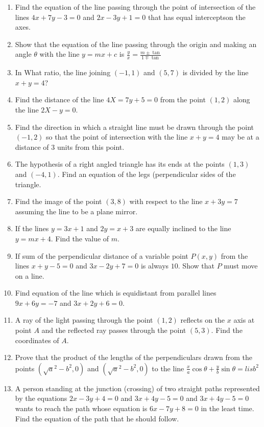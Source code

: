 \documentclass{article}
\theoremstyle{remark}
\begin{document}
\begin{enumerate}
\item Find the equation of the line passing through the point of intersection of the lines $4x+7y-3=0$ and $2x-3y+1=0$ that has equal interceptson the axes.
\item Show that the equation of the line passing through the origin and making an angle $\theta$ with the line $y=mx+c$ is $\frac {y}{x}=\frac {m\pm \tan}{1\mp \tan}$
\item In What ratio, the line joining $(-1,1)$ and $(5,7)$ is divided by the line $x+y=4$?
\item Find the distance of the line $4X=7y+5=0$ from the point $(1,2)$ along the line $2X-y=0$.
\item Find the direction in which a straight line must be  drawn through the point $(-1,2)$ so that the point of intersection with the line $x+y=4$ may be at a distance of $3$ units from this point.
\item The hypothesis of a right angled triangle has its ends at the points $(1,3)$ and $(-4,1)$. Find an equation of the legs (perpendicular sides of the triangle.
\item Find the image of the point $(3,8)$ with respect to the line $x+3y=7$ assuming the line to be a plane mirror.
\item If the lines $y= 3x+1$ and $2y= x+3$ are equally inclined to the line $y= mx+4$. Find the value of $m$.
\item If sum of the perpendicular distance of a variable point $P(x,y)$ from the lines $x+y-5=0$ and $3x-2y+7=0$ is always $10$. Show that $P$ must move on a line.
\item Find equation of the line which is equidistant from parallel lines $9x+6y=-7$ and $3x+2y+6=0$.
\item A ray of the light passing through the point $(1,2)$ reflects on the $x$ axis at point $A$ and the reflected ray passes through the point $(5,3)$. Find the coordinates of $A$.
\item Prove that the product of the lengths of the perpendiculars drawn from the points $(\sqrt a^2-b^2, 0)$ and $(\sqrt a^2-b^2, 0)$ to the line $\frac{x}{a} \cos \theta + \frac{y}{b} \sin \theta = lis b^2$
\item A person standing at the junction (crossing) of two straight paths represented by the equations $2x-3y+4=0$ and $3x+4y-5 = 0$ and $3x+4y-5= 0 $ wants to reach the path whose equation is $6x-7y+8=0$ in the least time. Find the equation of the path that he should follow.
\end{enumerate}
\end{document}
